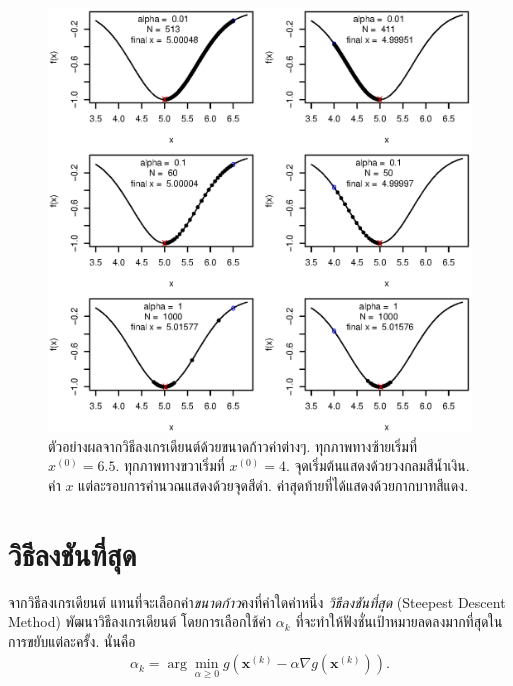
%
\begin{figure}
\begin{center}
\includegraphics[width=5.0in]
{02Background/gdFixedStepSize.eps}
\end{center}
\caption{ตัวอย่างผลจากวิธีลงเกรเดียนต์ด้วยขนาดก้าวค่าต่างๆ.
ทุกภาพทางซ้ายเริ่มที่ $x^{(0)} = 6.5$. 
ทุกภาพทางขวาเริ่มที่  $x^{(0)} = 4$.
จุดเริ่มต้นแสดงด้วยวงกลมสีน้ำเงิน.
ค่า $x$ แต่ละรอบการคำนวณแสดงด้วยจุดสีดำ.
ค่าสุดท้ายที่ได้แสดงด้วยกากบาทสีแดง.}
\label{fig: gradient descent step sizes}
\end{figure}
%

\section{วิธีลงชันที่สุด} 
\label{sec: steepest descent method}

จากวิธีลงเกรเดียนต์ แทนที่จะเลือกค่า\textit{ขนาดก้าว}คงที่ค่าใดค่าหนึ่ง
\textit{วิธีลงชันที่สุด} (Steepest Descent Method) พัฒนาวิธีลงเกรเดียนต์ โดยการเลือกใช้ค่า $\alpha_k$ ที่จะทำให้ฟังชั่นเป้าหมายลดลงมากที่สุดในการขยับแต่ละครั้ง.
นั่นคือ
\begin{eqnarray}
   \alpha_k = \arg \min_{\alpha \geq 0} g(\mathbf{x}^{(k)} - \alpha \nabla g(\mathbf{x}^{(k)})).
\end{eqnarray}

